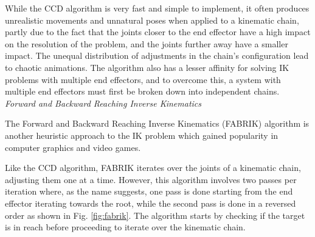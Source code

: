While the CCD algorithm is very fast and simple to implement, it often produces
unrealistic movements and unnatural poses when applied to a kinematic chain,
partly due to the fact that the joints closer to the end effector have a high
impact on the resolution of the problem, and the joints further away have
a smaller impact. The unequal distribution of adjustments in the chain's
configuration lead to chaotic animations. The algorithm also has a lesser
affinity for solving IK problems with multiple end effectors, and to overcome
this, a system with multiple end effectors must first be broken down into
independent chains. \\

\noindent\textit{Forward and Backward Reaching Inverse Kinematics}

The Forward and Backward Reaching Inverse Kinematics (FABRIK) algorithm
\cite{Aristidou2011} is another heuristic approach to the IK problem which
gained popularity in computer graphics and video games. 

Like the CCD algorithm, FABRIK iterates over the joints of a kinematic chain,
adjusting them one at a time. However, this algorithm involves two passes per
iteration where, as the name suggests, one pass is done starting from the end
effector iterating towards the root, while the second pass is done in a reversed
order as shown in Fig. \ref{fig:fabrik}. The algorithm starts by checking if the
target is in reach before proceeding to iterate over the kinematic chain. 

